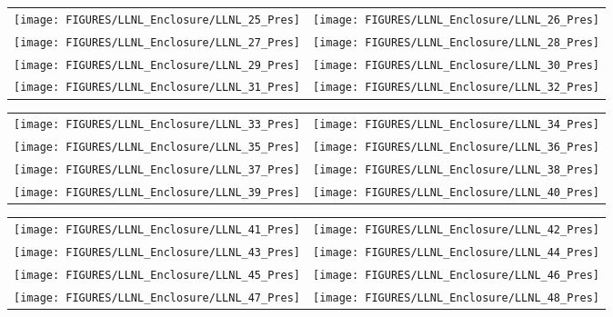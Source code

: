 \begin{figure}[p]
\begin{tabular*}{\textwidth}{l@{\extracolsep{\fill}}r}
\texttt{[image: FIGURES/LLNL\_Enclosure/LLNL\_25\_Pres]} &
\texttt{[image: FIGURES/LLNL\_Enclosure/LLNL\_26\_Pres]} \\
\texttt{[image: FIGURES/LLNL\_Enclosure/LLNL\_27\_Pres]} &
\texttt{[image: FIGURES/LLNL\_Enclosure/LLNL\_28\_Pres]} \\
\texttt{[image: FIGURES/LLNL\_Enclosure/LLNL\_29\_Pres]} &
\texttt{[image: FIGURES/LLNL\_Enclosure/LLNL\_30\_Pres]} \\
\texttt{[image: FIGURES/LLNL\_Enclosure/LLNL\_31\_Pres]} &
\texttt{[image: FIGURES/LLNL\_Enclosure/LLNL\_32\_Pres]}
\end{tabular*}
\label{LLNL_Enclosure_Pres_4}
\end{figure}

\begin{figure}[p]
\begin{tabular*}{\textwidth}{l@{\extracolsep{\fill}}r}
\texttt{[image: FIGURES/LLNL\_Enclosure/LLNL\_33\_Pres]} &
\texttt{[image: FIGURES/LLNL\_Enclosure/LLNL\_34\_Pres]} \\
\texttt{[image: FIGURES/LLNL\_Enclosure/LLNL\_35\_Pres]} &
\texttt{[image: FIGURES/LLNL\_Enclosure/LLNL\_36\_Pres]} \\
\texttt{[image: FIGURES/LLNL\_Enclosure/LLNL\_37\_Pres]} &
\texttt{[image: FIGURES/LLNL\_Enclosure/LLNL\_38\_Pres]} \\
\texttt{[image: FIGURES/LLNL\_Enclosure/LLNL\_39\_Pres]} &
\texttt{[image: FIGURES/LLNL\_Enclosure/LLNL\_40\_Pres]}
\end{tabular*}
\label{LLNL_Enclosure_Pres_5}
\end{figure}

\begin{figure}[p]
\begin{tabular*}{\textwidth}{l@{\extracolsep{\fill}}r}
\texttt{[image: FIGURES/LLNL\_Enclosure/LLNL\_41\_Pres]} &
\texttt{[image: FIGURES/LLNL\_Enclosure/LLNL\_42\_Pres]} \\
\texttt{[image: FIGURES/LLNL\_Enclosure/LLNL\_43\_Pres]} &
\texttt{[image: FIGURES/LLNL\_Enclosure/LLNL\_44\_Pres]} \\
\texttt{[image: FIGURES/LLNL\_Enclosure/LLNL\_45\_Pres]} &
\texttt{[image: FIGURES/LLNL\_Enclosure/LLNL\_46\_Pres]} \\
\texttt{[image: FIGURES/LLNL\_Enclosure/LLNL\_47\_Pres]} &
\texttt{[image: FIGURES/LLNL\_Enclosure/LLNL\_48\_Pres]}
\end{tabular*}
\label{LLNL_Enclosure_Pres_6}
\end{figure}

